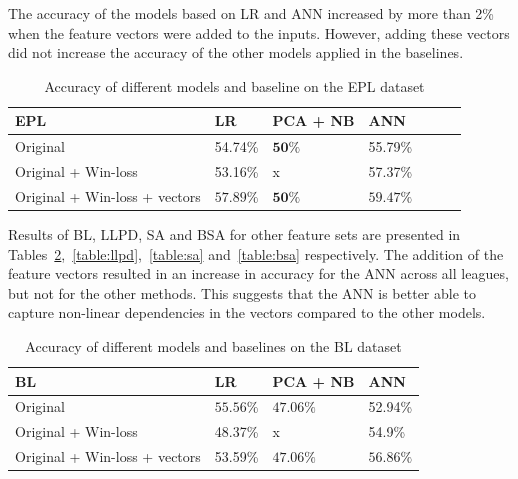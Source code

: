 \documentclass[thesis=M,english]{FITthesis}[2019/12/23]
\begin{document}
The accuracy of the models based on LR and ANN increased by more than 2\% when the feature vectors were added to the inputs. However, adding these vectors did not increase the accuracy of the other models applied in the baselines.

\begin{table}
\begin{center}
\begin{tabular}{|p{}| l | p{} | l | l | l | l |}
 \hline
 EPL & LR & PCA + NB & ANN \\ 
 \hline
 Original & 54.74\% & $\mathbf{50\%}$ & 55.79\% \\  
 \hline
 Original + Win-loss & 53.16\% & x & 57.37\% \\ 
 \hline
 Original + Win-loss + vectors & $\mathbf{57.89\%}$ & $\mathbf{50\%}$ & $\mathbf{59.47\%}$ \\  
 \hline
\end{tabular}
\caption{Accuracy of different models and baseline on the EPL dataset}
\label{table:epl}
\end{center}
\end{table}

Results of BL, LLPD, SA and BSA for other feature sets are presented in Tables~\ref{table:bl},~\ref{table:llpd},~\ref{table:sa} and~\ref{table:bsa} respectively. The addition of the feature vectors resulted in an increase in accuracy for the ANN across all leagues, but not for the other methods. This suggests that the ANN is better able to capture non-linear dependencies in the vectors compared to the other models.

\begin{table}
\begin{center}
\begin{tabular}{|p{}| l | p{} | l |}
 \hline
 BL & LR & PCA + NB & ANN \\ 
 \hline
 Original & $\mathbf{55.56\%}$ & $\mathbf{47.06\%}$ & 52.94\% \\  
 \hline
 Original + Win-loss & 48.37\% & x & 54.9\% \\ 
 \hline
 Original + Win-loss + vectors & 53.59\% & $\mathbf{47.06\%}$ & $\mathbf{56.86\%}$ \\  
 \hline
\end{tabular}
\caption{Accuracy of different models and baselines on the BL dataset}
\label{table:bl}
\end{center}
\end{table}
\end{document}
